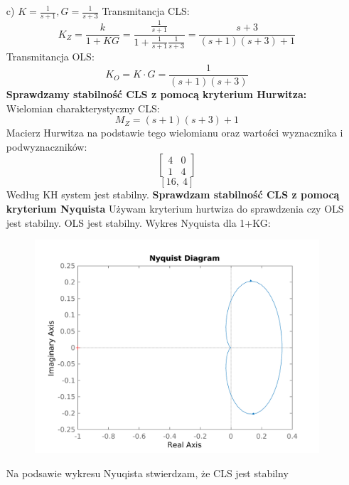 \documentclass{article}
\begin{document}
\begin{itemize}
    \item[c)] $K=\frac{1}{s + 1}, G=\frac{1}{s + 3}$
    Transmitancja CLS:
    $$K_Z=\frac{k}{1+KG}=\frac{\frac{1}{s + 1}}{1+\frac{1}{s + 1}\frac{1}{s + 3}}=\frac{s + 3}{\left(s + 1\right) \left(s + 3\right) + 1}$$
    Transmitancja OLS:
    $$K_O=K\cdot G=\frac{1}{\left(s + 1\right) \left(s + 3\right)}$$
    \textbf{Sprawdzamy stabilność CLS z pomocą kryterium Hurwitza:}\newline
    Wielomian charakterystyczny CLS:
    $$M_Z=\left(s + 1\right) \left(s + 3\right) + 1$$
    Macierz Hurwitza na podstawie tego wielomianu oraz wartości wyznacznika i podwyznaczników:
    $$\left[\begin{matrix}4 & 0\\1 & 4\end{matrix}\right]$$
    $$\left[ 16, \  4\right]$$
    Według KH system jest stabilny.
    \newline\textbf{Sprawdzam stabilność CLS z pomocą kryterium Nyquista}\newline
    Używam kryterium hurtwiza do sprawdzenia czy OLS jest stabilny. OLS jest stabilny.
    Wykres Nyquista dla 1+KG:   
    \begin{figure}
        \includegraphics[scale=0.8]{c.png}
        \centering
    \end{figure}
    Na podsawie wykresu Nyuqista stwierdzam, że CLS jest stabilny
    \newpage            
        

\end{itemize}
\end{document}

